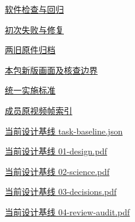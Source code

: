 \documentclass[11pt,a4paper]{article}
\begin{document}
\href{file:///D:/Agent/srp/agent/tasks/E-02/evidence/verification.json}{软件检查与回归}


\href{file:///D:/Agent/srp/agent/tasks/E-02/evidence/failure-disposition.md}{初次失败与修复}


\href{file:///D:/Agent/srp/agent/tasks/E-02/archive/README.md}{两旧原件归档}


\href{file:///D:/Agent/srp/agent/tasks/E-02/outputs/current-implementation-evidence.md}{本包新版画面及核查边界}


\href{file:///D:/Agent/srp/agent/design/weather/2026-10-08_Storm\%E4\%B8\%8E\%E7\%BA\%AF\%E7\%B2\%92\%E5\%AD\%90\%E5\%8F\%8C\%E7\%8E\%AF\%E5\%AE\%9E\%E6\%96\%BD\%E6\%A0\%87\%E5\%87\%86.md}{统一实施标准}


\href{file:///D:/Agent/srp/human/assets/previews/2026-10-08/member-storm-particle-rings/frame-index.json}{成员原视频帧索引}


\href{file:///D:/Agent/srp/agent/design/design-foundation-20261008/task-baseline.json}{当前设计基线 task-\allowbreak{}baseline.json}


\href{file:///D:/Agent/srp/agent/design/design-foundation-20261008/01-design.pdf}{当前设计基线 01-\allowbreak{}design.pdf}


\href{file:///D:/Agent/srp/agent/design/design-foundation-20261008/02-science.pdf}{当前设计基线 02-\allowbreak{}science.pdf}


\href{file:///D:/Agent/srp/agent/design/design-foundation-20261008/03-decisions.pdf}{当前设计基线 03-\allowbreak{}decisions.pdf}


\href{file:///D:/Agent/srp/agent/design/design-foundation-20261008/04-review-audit.pdf}{当前设计基线 04-\allowbreak{}review-\allowbreak{}audit.pdf}
\end{document}
